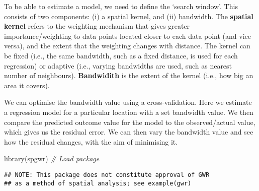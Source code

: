 \documentclass[
]{book}
\newenvironment{Shaded}{\begin{snugshade}}{\end{snugshade}}
\newcommand{\AttributeTok}[1]{\textcolor[rgb]{0.77,0.63,0.00}{#1}}
\newcommand{\CommentTok}[1]{\textcolor[rgb]{0.56,0.35,0.01}{\textit{#1}}}
\newcommand{\ConstantTok}[1]{\textcolor[rgb]{0.00,0.00,0.00}{#1}}
\newcommand{\FunctionTok}[1]{\textcolor[rgb]{0.00,0.00,0.00}{#1}}
\newcommand{\NormalTok}[1]{#1}
\newcommand{\OtherTok}[1]{\textcolor[rgb]{0.56,0.35,0.01}{#1}}
\newcommand{\SpecialCharTok}[1]{\textcolor[rgb]{0.00,0.00,0.00}{#1}}
\newcommand{\StringTok}[1]{\textcolor[rgb]{0.31,0.60,0.02}{#1}}
\begin{document}
To be able to estimate a model, we need to define the `search window'. This consists of two components: (i) a spatial kernel, and (ii) bandwidth. The \textbf{spatial kernel} refers to the weighting mechanism that gives greater importance/weighting to data points located closer to each data point (and vice versa), and the extent that the weighting changes with distance. The kernel can be fixed (i.e., the same bandwidth, such as a fixed distance, is used for each regression) or adaptive (i.e., varying bandwidths are used, such as nearest number of neighbours). \textbf{Bandwidith} is the extent of the kernel (i.e., how big an area it covers).

We can optimise the bandwidth value using a cross-validation. Here we estimate a regression model for a particular location with a set bandwidth value. We then compare the predicted outcome value for the model to the observed/actual value, which gives us the residual error. We can then vary the bandwidth value and see how the residual changes, with the aim of minimising it.

\begin{Shaded}
\begin{Highlighting}[]
\FunctionTok{library}\NormalTok{(spgwr) }\CommentTok{\# Load package}
\end{Highlighting}
\end{Shaded}

\begin{verbatim}
## NOTE: This package does not constitute approval of GWR
## as a method of spatial analysis; see example(gwr)
\end{verbatim}

\begin{Shaded}
\end{Shaded}
\end{document}
